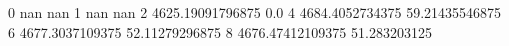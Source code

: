 0 nan nan
1 nan nan
2 4625.19091796875 0.0
4 4684.4052734375 59.21435546875
6 4677.3037109375 52.11279296875
8 4676.47412109375 51.283203125
